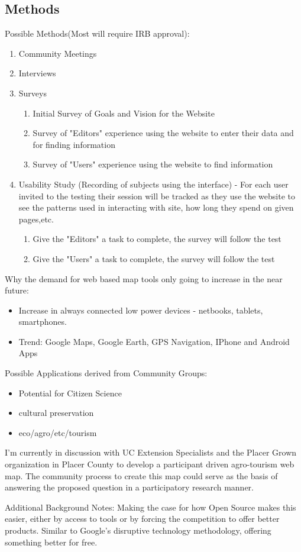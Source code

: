 \documentclass[12pt,letterpaper]{article}
\begin{document}
\subsection{Methods}
Possible Methods(Most will require IRB approval):
\begin{enumerate}
\item Community Meetings
\item Interviews
\item Surveys
	\begin{enumerate}
	\item Initial Survey of Goals and Vision for the Website
	\item Survey of "Editors" experience using the website to enter their data and for finding information
	\item Survey of "Users" experience using the website to find information
	\end{enumerate}
\item Usability Study (Recording of subjects using the interface) - For each user invited to the testing their session will be tracked as they use the website to see the patterns used in interacting with site, how long they spend on given pages,etc.
	\begin{enumerate}
	\item Give the "Editors" a task to complete, the survey will follow the test
	\item Give the "Users" a task to complete, the survey will follow the test
	\end{enumerate}
\end{enumerate}


Why the demand for web based map tools only going to increase in the near future:
\begin{itemize}
\item Increase in always connected low power devices - netbooks, tablets, smartphones.
\item Trend: Google Maps, Google Earth, GPS Navigation, IPhone and Android Apps  
\end{itemize}
Possible Applications derived from Community Groups:
\begin{itemize}
\item Potential for Citizen Science
\item cultural preservation
\item eco/agro/etc/tourism
\end{itemize} 

I'm currently in discussion with UC Extension Specialists and the Placer Grown organization in Placer County to develop a participant driven agro-tourism web map. The community process to create this map could serve as the basis of answering the proposed question in a participatory research manner.

Additional Background Notes:
Making the case for how Open Source makes this easier, either by access to tools or by forcing the competition to offer better products. Similar to Google's disruptive technology methodology, offering something better for free.

\printbibliography
\end{document}
